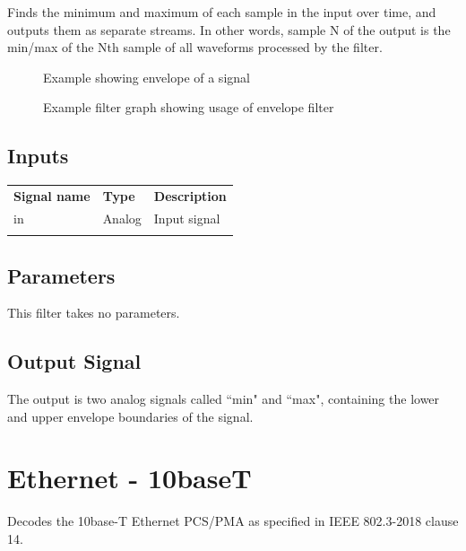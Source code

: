Finds the minimum and maximum of each sample in the input over time, and outputs them as separate streams. In other
words, sample N of the output is the min/max of the Nth sample of all waveforms processed by the filter.

\begin{figure}[h]
\centering
{}
\caption{Example showing envelope of a signal}
\label{filter_envelope}
\end{figure}

\begin{figure}[h]
\centering
{}
\caption{Example filter graph showing usage of envelope filter}
\label{filter_graph_envelope}
\end{figure}

\subsection{Inputs}

\begin{tabularx}{16cm}{llX}
\thickhline
\textbf{Signal name} & \textbf{Type} & \textbf{Description} \\
\thickhline
in & Analog & Input signal\\
\thickhline
\end{tabularx}

\subsection{Parameters}

This filter takes no parameters.

\subsection{Output Signal}

The output is two analog signals called ``min" and ``max", containing the lower and upper envelope boundaries of the
signal.

\pagebreak
\section{Ethernet - 10baseT}
\label{filter:10baset}

Decodes the 10base-T Ethernet PCS/PMA as specified in IEEE 802.3-2018 clause 14.

